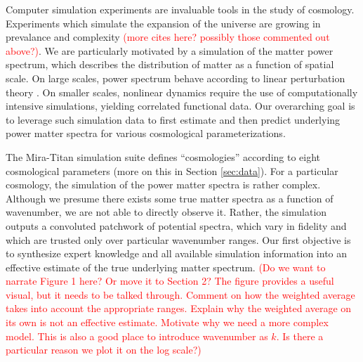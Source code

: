 \documentclass[11pt]{article}
\begin{document}
Computer simulation experiments are invaluable tools in the study of cosmology.
Experiments which simulate the expansion of the universe are growing
in prevalance and complexity \citep[e.g.,][]{lawrence2010coyote,moran2023mira}
\textcolor{red}{(more cites here? possibly those commented out above?)}.  
We are particularly motivated by a simulation
of the matter power spectrum, which describes the distribution of matter as a 
function of spatial scale. 
On large scales, power spectrum behave according to linear perturbation 
theory \citep{pietroni2008flowing, lesgourgues2009non}.  On smaller scales, nonlinear 
dynamics require the use of computationally intensive simulations, yielding
correlated functional data.
Our overarching goal is to leverage such simulation data to 
first estimate and then predict underlying power matter spectra for various 
cosmological parameterizations.


The Mira-Titan simulation suite \citep{moran2023mira}
defines ``cosmologies'' according to eight cosmological parameters (more on this
in Section \ref{sec:data}).  For a particular cosmology, the simulation of the power matter spectra 
is rather complex.  Although we presume there exists some true matter spectra as a function
of wavenumber, we are not able to directly observe it.  Rather, the simulation outputs 
a convoluted patchwork of potential spectra, which vary in fidelity and which are trusted
only over particular wavenumber ranges.  Our first objective is to synthesize expert knowledge
and all available simulation information into an effective estimate of the true underlying
matter spectrum.  \textcolor{red}{(Do we want to narrate Figure 1 here?  Or move it to Section 2?  
The figure provides a useful visual, but it needs to be talked through.  Comment on how
the weighted average takes into account the appropriate ranges.  Explain why the weighted
average on its own is not an effective estimate.  Motivate why we need a more complex model.
This is also a good place to introduce wavenumber as $k$.  Is there a particular reason
we plot it on the log scale?)}
\end{document}
